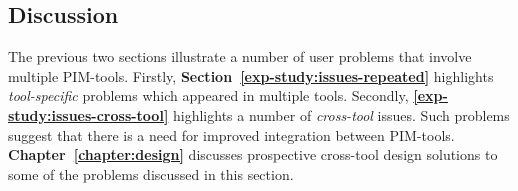 \subsection{Discussion}
The previous two sections illustrate a number of user problems that involve multiple PIM-tools. Firstly, \textbf{Section~\ref{exp-study:issues-repeated}} highlights \textit{tool-specific} problems which appeared in multiple tools.  Secondly, \textbf{\ref{exp-study:issues-cross-tool}} highlights a number of \textit{cross-tool} issues.  Such problems suggest that there is a need for improved integration between PIM-tools. \textbf{Chapter~\ref{chapter:design}} discusses prospective cross-tool design solutions to some of the problems discussed in this section.













	


